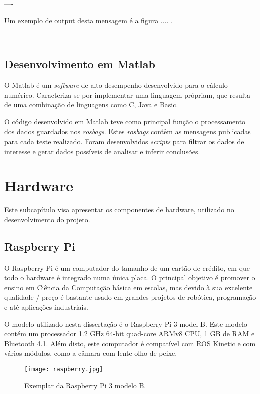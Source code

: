 ----

Um exemplo de output desta mensagem é a figura .... .

---



\subsection{Desenvolvimento em Matlab}

O Matlab é um \textit{software} de alto desempenho desenvolvido para o cálculo numérico. Caracteriza-se por implementar uma linguagem própriam, que resulta de uma combinação de linguagens como C, Java e Basic.

O código desenvolvido em Matlab teve como principal função o processamento dos dados guardados nos \textit{rosbags}. Estes \textit{rosbags} contêm as mensagens publicadas para cada teste realizado. Foram desenvolvidos \textit{scripts} para filtrar os dados de interesse e gerar dados possíveis de analisar e inferir conclusões.


\section{Hardware}

Este subcapítulo visa apresentar os componentes de hardware, utilizado no desenvolvimento do projeto.

\subsection{Raspberry Pi}

O Raspberry Pi é um computador do tamanho de um cartão de crédito, em que todo o hardware é integrado numa única placa. O principal objetivo é promover o ensino em Ciência da Computação básica em escolas, mas devido à sua excelente qualidade / preço é bastante usado em grandes projetos de robótica, programação e até aplicações industriais. 

O modelo utilizado nesta dissertação é o Raspberry Pi 3 model B. Este modelo contém um processador 1.2 GHz 64-bit quad-core ARMv8 CPU, 1 GB de RAM e Bluetooth 4.1. Além disto, este computador é compatível com ROS Kinetic e com vários módulos, como a câmara com lente olho de peixe.

\begin{figure}[h!] %
	\begin{center}
		\leavevmode		
		\texttt{[image: raspberry.jpg]}
		\caption{Exemplar da Raspberry Pi 3 modelo B.}
		\label{fig:raspberry}
	\end{center}
\end{figure}

